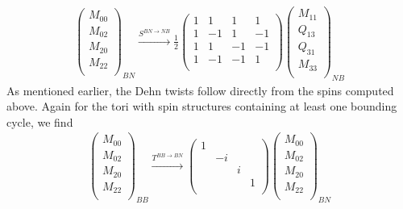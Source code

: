 \documentclass[12pt,a4paper]{article}
\newcounter{arrow}
\begin{document}
\begin{align}
\left( \begin{matrix}
M_{00}\\
M_{02}\\
M_{20}\\
M_{22}\\
\end{matrix} \right)_{BN}
\xrightarrow{S^{BN \rightarrow NB}}
\frac{1}{2} \left( \begin{matrix}
1&1&1&1\\
1&-1&1&-1\\
1&1&-1&-1\\
1&-1&-1&1\\
\end{matrix} \right)
\left( \begin{matrix}
M_{11}\\
Q_{13}\\
Q_{31}\\
M_{33}\\
\end{matrix} \right)_{NB}
\end{align}
As mentioned earlier, the Dehn twists follow directly from the spins computed above.
Again for the tori with spin structures containing at least one bounding cycle, we find
\begin{align}
\left( \begin{matrix}
M_{00}\\
M_{02}\\
M_{20}\\
M_{22}\\
\end{matrix} \right)_{BB}
\xrightarrow{T^{BB \rightarrow BN}}
\left( \begin{matrix}
1&&&\\
&-i&&\\
&&i&\\
&&&1\\
\end{matrix} \right)
\left( \begin{matrix}
M_{00}\\
M_{02}\\
M_{20}\\
M_{22}\\
\end{matrix} \right)_{BN}
\end{align}
\end{document}
